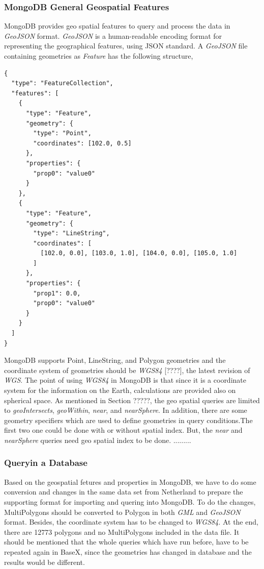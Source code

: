 \documentclass[a4paper,12pt]{article}
\begin{document}
\subsubsection {MongoDB General Geospatial Features}
MongoDB provides geo spatial features to query and process the data in \textit{GeoJSON} format. \textit{GeoJSON} is a human-readable encoding format for representing the geographical features, using JSON standard. A \textit{GeoJSON} file containing geometries as \textit{Feature} has the following structure,

\begin{verbatim}
{
  "type": "FeatureCollection",
  "features": [
    {
      "type": "Feature",
      "geometry": {
        "type": "Point",
        "coordinates": [102.0, 0.5]
      },
      "properties": {
        "prop0": "value0"
      }
    },
    {
      "type": "Feature",
      "geometry": {
        "type": "LineString",
        "coordinates": [
          [102.0, 0.0], [103.0, 1.0], [104.0, 0.0], [105.0, 1.0]
        ]
      },
      "properties": {
        "prop1": 0.0,
        "prop0": "value0"
      }
    }
  ]
}
\end{verbatim}


MongoDB supports Point, LineString, and Polygon geometries and the coordinate system of geometries should be \textit{WGS84} [????], the latest revision of \textit{WGS}. The point of using \textit{WGS84} in MongoDB is that since it is a coordinate system for the information on the Earth, calculations are provided also on spherical space. As mentioned in Section ?????, the geo spatial queries are limited to \textit{geoIntersects}, \textit{geoWithin}, \textit{near}, and \textit{nearSphere}. In addition, there are some geometry specifiers which are used to define geometries in query conditions.The first two one could be done with or without spatial index. But, the \textit{near} and \textit{nearSphere} queries need geo spatial index to be done.
.........


\subsubsection{Queryin a Database}

Based on the geospatial fetures and properties in MongoDB, we have to do some conversion and changes in the same data set from Netherland to prepare the supporting format for importing and quering into MongoDB. To do the changes, MultiPolygons should be converted to Polygon in both \textit{GML} and \textit{GeoJSON} format. Besides, the coordinate system has to be changed to \textit{WGS84}. At the end, there are 12773 polygons and no MultiPolygons included in the data file. It should be mentioned that the whole queries which have run before, have to be repeated again in BaseX, since the geometries has changed in database and the results would be different.
\end{document}
